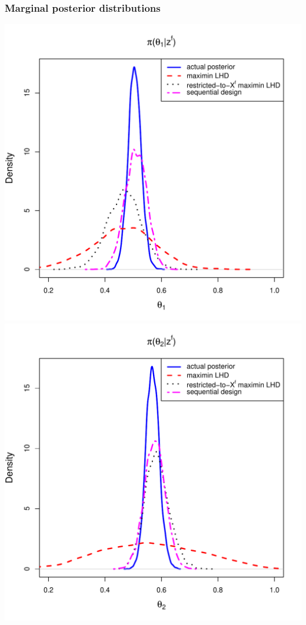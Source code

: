 \documentclass[nopagenumber,9pt]{beamer}
\begin{document}
\begin{frame}
 \frametitle{Marginal posterior distributions}
 
 \includegraphics[scale=0.22]{ExSobold6_marg1_150.pdf}
  \includegraphics[scale=0.22]{ExSobold6_marg2_150.pdf}\\
 

\end{frame}
\end{document}
